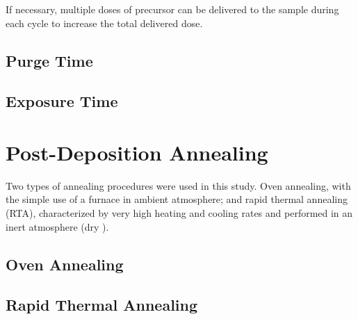 If necessary, multiple doses of precursor can be delivered to the sample during each cycle to increase the total delivered dose.


\subsection{Purge Time}

\lipsum


\subsection{Exposure Time}

\lipsum


\section{Post-Deposition Annealing}
\label{sec:SampFab-Annealing}

Two types of annealing procedures were used in this study. Oven annealing, with the simple use of a furnace in ambient atmosphere; and rapid thermal annealing (RTA), characterized by very high heating and cooling rates and performed in an inert atmosphere (dry ). 



\subsection{Oven Annealing}




\subsection{Rapid Thermal Annealing}







